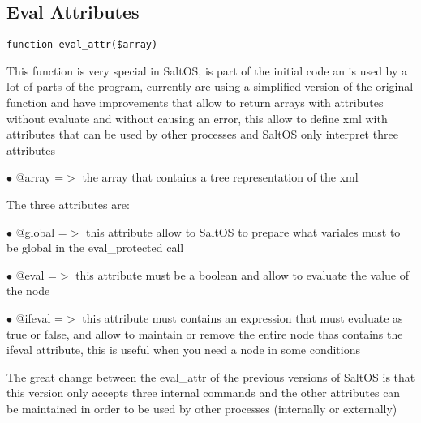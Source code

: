 \documentclass[a4paper]{book}
\begin{document}
\hypertarget{toc326}{}
\subsection{Eval Attributes}

\begin{lstlisting}
function eval_attr($array)
\end{lstlisting}

This function is very special in SaltOS, is part of the initial code an
is used by a lot of parts of the program, currently are using a simplified
version of the original function and have improvements that allow to return
arrays with attributes without evaluate and without causing an error, this
allow to define xml with attributes that can be used by other processes and
SaltOS only interpret three attributes

\begin{compactitem}
\item[\color{myblue}$\bullet$] @array =$>$ the array that contains a tree representation of the xml
\end{compactitem}

The three attributes are:

\begin{compactitem}
\item[\color{myblue}$\bullet$] @global =$>$ this attribute allow to SaltOS to prepare what variales must to
be global in the eval\_protected call
\end{compactitem}

\begin{compactitem}
\item[\color{myblue}$\bullet$] @eval =$>$ this attribute must be a boolean and allow to evaluate the value
of the node
\end{compactitem}

\begin{compactitem}
\item[\color{myblue}$\bullet$] @ifeval =$>$ this attribute must contains an expression that must evaluate as
true or false, and allow to maintain or remove the entire node thas contains
the ifeval attribute, this is useful when you need a node in some conditions
\end{compactitem}

The great change between the eval\_attr of the previous versions of SaltOS is
that this version only accepts three internal commands and the other
attributes can be maintained in order to be used by other processes
(internally or externally)
\end{document}
